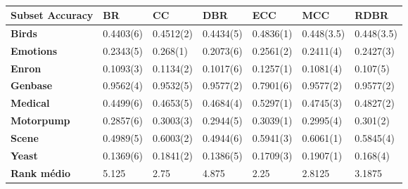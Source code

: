 \begin{table}[h]
\begin{tabular}{lllllll}
\hline
\textbf{Subset Accuracy} & \textbf{BR} & \textbf{CC} & \textbf{DBR} & \textbf{ECC} & \textbf{MCC} & \textbf{RDBR} \\ \hline
\textbf{Birds}           & 0.4403(6)   & 0.4512(2)   & 0.4434(5)    & 0.4836(1)    & 0.448(3.5)   & 0.448(3.5)    \\
\textbf{Emotions}        & 0.2343(5)   & 0.268(1)    & 0.2073(6)    & 0.2561(2)    & 0.2411(4)    & 0.2427(3)     \\
\textbf{Enron}           & 0.1093(3)   & 0.1134(2)   & 0.1017(6)    & 0.1257(1)    & 0.1081(4)    & 0.107(5)      \\
\textbf{Genbase}         & 0.9562(4)   & 0.9532(5)   & 0.9577(2)    & 0.7901(6)    & 0.9577(2)    & 0.9577(2)     \\
\textbf{Medical}         & 0.4499(6)   & 0.4653(5)   & 0.4684(4)    & 0.5297(1)    & 0.4745(3)    & 0.4827(2)     \\
\textbf{Motorpump}       & 0.2857(6)   & 0.3003(3)   & 0.2944(5)    & 0.3039(1)    & 0.2995(4)    & 0.301(2)      \\
\textbf{Scene}           & 0.4989(5)   & 0.6003(2)   & 0.4944(6)    & 0.5941(3)    & 0.6061(1)    & 0.5845(4)     \\
\textbf{Yeast}           & 0.1369(6)   & 0.1841(2)   & 0.1386(5)    & 0.1709(3)    & 0.1907(1)    & 0.168(4)      \\ \hline
\textbf{Rank médio}      & 5.125       & 2.75        & 4.875        & 2.25         & 2.8125       & 3.1875        \\ \hline
\end{tabular}
\caption{}
\label{tab:SAlogi}
\end{table}